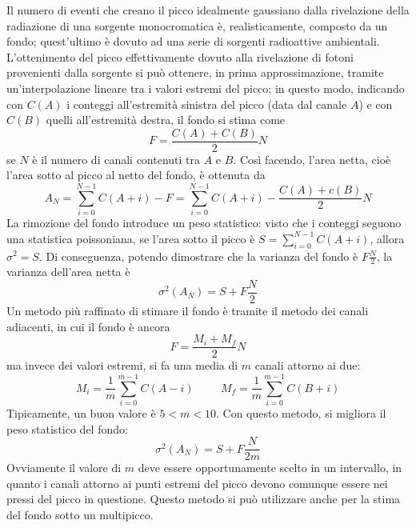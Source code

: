 \documentclass[11pt, a4paper]{scrartcl}
\theoremstyle{style}
\numberwithin{equation}{subsection}
\begin{document}
Il numero di eventi che creano il picco idealmente gaussiano dalla rivelazione della radiazione di una sorgente monocromatica \`e, realisticamente, composto da un fondo; quest'ultimo \`e dovuto ad una serie di sorgenti radioattive ambientali.
L'ottenimento del picco effettivamente dovuto alla rivelazione di fotoni provenienti dalla sorgente si pu\`o ottenere, in prima approssimazione, tramite un'interpolazione lineare tra i valori estremi del picco; in questo modo, indicando con $C(A)$ i conteggi all'estremit\`a sinistra del picco (data dal canale $A$) e con $C(B)$ quelli all'estremit\`a destra, il fondo si stima come
\begin{equation}
	F = \frac{C(A) + C(B)}{2} N
\end{equation}
se $N$ \`e il numero di canali contenuti tra $A$ e $B$.
Cos\`i facendo, l'area netta, cio\`e l'area sotto al picco al netto del fondo, \`e ottenuta da 
\begin{equation}
	A_N = \sum_{i=0}^{N-1} C(A+i) - F = \sum_{i=0}^{N-1} C(A+i) - \frac{C(A) + c(B)}{2}N
\end{equation}
La rimozione del fondo introduce un peso statistico: visto che i conteggi seguono una statistica poissoniana, se l'area sotto il picco \`e $S = \sum_{i=0}^{N-1} C(A+i)$, allora $\sigma ^2 = S$.
Di conseguenza, potendo dimostrare che la varianza del fondo \`e $F \frac{N}{2}$, la varianza dell'area netta \`e
\begin{equation}
	\sigma ^2 (A_N) = S+F \frac{N}{2}
\end{equation}
Un metodo pi\`u raffinato di stimare il fondo \`e tramite il metodo dei canali adiacenti, in cui il fondo \`e ancora 
\begin{equation}
	F = \frac{M_i + M_f}{2}N
\end{equation}
ma invece dei valori estremi, si fa una media di $m$ canali attorno ai due:
\[
M_i = \frac{1}{m} \sum_{i=0}^{m-1}  C(A-i) \hspace{1cm}M_f = \frac{1}{m} \sum_{i=0}^{m-1} C(B+i)
\] 
Tipicamente, un buon valore \`e $5 < m < 10$.
Con questo metodo, si migliora il peso statistico del fondo:
\begin{equation}
	\sigma ^2 (A_N) = S + F \frac{N}{2m}
\end{equation}
Ovviamente il valore di $m$ deve essere opportunamente scelto in un intervallo, in quanto i canali attorno ai punti estremi del picco devono comunque essere nei pressi del picco in questione.
Questo metodo si pu\`o utilizzare anche per la stima del fondo sotto un multipicco.
\end{document}
